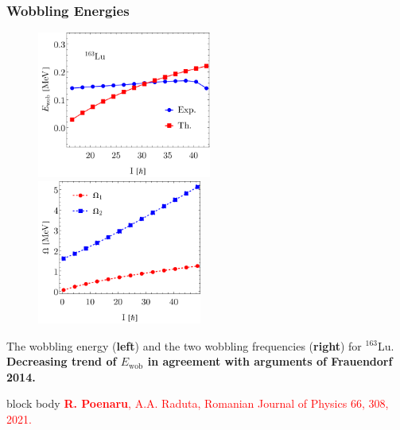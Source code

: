 \documentclass{beamer}
\begin{document}
\begin{frame}
	\frametitle{Wobbling Energies}
	\vspace{-0.5cm}
	\begin{figure}
		\centering
		\includegraphics[width=0.51\textwidth]{figures/Wobbling-Energy-Parity-Partners.pdf}
		\includegraphics[width=0.48\textwidth]{figures/parity-partners-plots/wobblingFrequency.pdf}
	\end{figure}
	\vspace{-0.5cm}
	The wobbling energy (\textbf{left}) and the two wobbling frequencies (\textbf{right}) for $^{163}$Lu. \textbf{Decreasing trend of $E_\text{wob}$ in agreement with arguments of Frauendorf 2014.}
	\begin{beamercolorbox}[rounded=true,shadow=false, wd=\linewidth,]{block body}
		\centering
		\textcolor{red}{\footnotesize{\textbf{R. Poenaru}, A.A. Raduta, Romanian Journal of Physics 66, 308, 2021.}}
	\end{beamercolorbox}
\end{frame}
\end{document}
